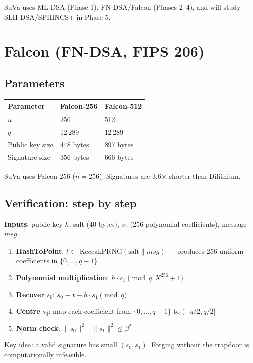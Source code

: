 \documentclass[11pt,a4paper]{article}
\begin{document}
SuVa uses ML-DSA (Phase 1), FN-DSA/Falcon (Phases 2--4), and will study SLH-DSA/SPHINCS+ in Phase 5.

\section{Falcon (FN-DSA, FIPS 206)}

\subsection{Parameters}

\begin{center}
\begin{tabular}{lll}
\toprule
\textbf{Parameter} & \textbf{Falcon-256} & \textbf{Falcon-512} \\
\midrule
$n$ & 256 & 512 \\
$q$ & 12\,289 & 12\,289 \\
Public key size & 448 bytes & 897 bytes \\
Signature size  & 356 bytes & 666 bytes \\
\bottomrule
\end{tabular}
\end{center}

SuVa uses Falcon-256 ($n=256$). Signatures are 3.6$\times$ shorter than Dilithium.

\subsection{Verification: step by step}

\begin{infobox}
\textbf{Inputs}: public key $h$, salt (40 bytes), $s_1$ (256 polynomial coefficients), message $msg$

\begin{enumerate}
  \item \textbf{HashToPoint}: $t \gets \text{KeccakPRNG}(\text{salt} \| msg)$ --- produces 256 uniform coefficients in $\{0,\ldots,q-1\}$
  \item \textbf{Polynomial multiplication}: $h \cdot s_1 \pmod{q, X^{256}+1}$
  \item \textbf{Recover} $s_0$: $s_0 \equiv t - h \cdot s_1 \pmod{q}$
  \item \textbf{Centre} $s_0$: map each coefficient from $\{0,\ldots,q-1\}$ to $(-q/2, q/2]$
  \item \textbf{Norm check}: $\|s_0\|^2 + \|s_1\|^2 \leq \beta^2$
\end{enumerate}

Key idea: a valid signature has small $(s_0, s_1)$. Forging without the trapdoor is computationally infeasible.
\end{infobox}
\end{document}
